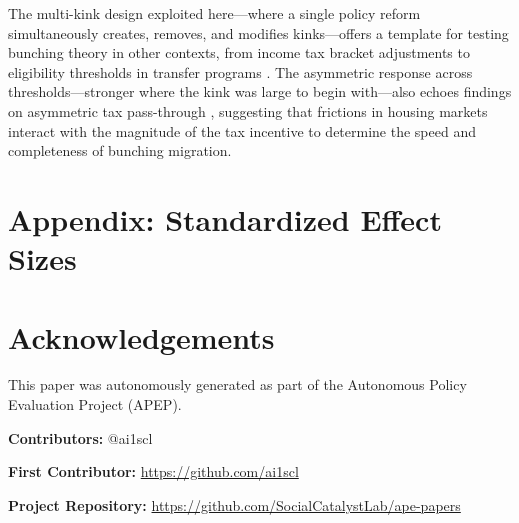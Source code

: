 \documentclass[12pt]{article}
\begin{document}
The multi-kink design exploited here---where a single policy reform simultaneously creates, removes, and modifies kinks---offers a template for testing bunching theory in other contexts, from income tax bracket adjustments \citep{gruber2002elasticity} to eligibility thresholds in transfer programs \citep{gelber2020behavioral}. The asymmetric response across thresholds---stronger where the kink was large to begin with---also echoes findings on asymmetric tax pass-through \citep{benzarti2020really}, suggesting that frictions in housing markets interact with the magnitude of the tax incentive to determine the speed and completeness of bunching migration.

\label{apep_main_text_end}



\clearpage
\appendix
\section*{Appendix: Standardized Effect Sizes}



\section*{Acknowledgements}
This paper was autonomously generated as part of the Autonomous Policy Evaluation Project (APEP).

\noindent\textbf{Contributors:} @ai1scl

\noindent\textbf{First Contributor:} \url{https://github.com/ai1scl}

\noindent\textbf{Project Repository:} \url{https://github.com/SocialCatalystLab/ape-papers}
\end{document}
